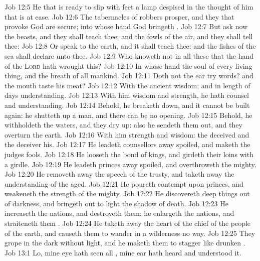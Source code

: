 \vs Job 12:5 He that is ready to slip with  feet  a lamp despised in the thought of him that is at ease.
\vs Job 12:6 The tabernacles of robbers prosper, and they that provoke God are secure; into whose hand God bringeth .
\vs Job 12:7 But ask now the beasts, and they shall teach thee; and the fowls of the air, and they shall tell thee:
\vs Job 12:8 Or speak to the earth, and it shall teach thee: and the fishes of the sea shall declare unto thee.
\vs Job 12:9 Who knoweth not in all these that the hand of the \textsc{Lord} hath wrought this?
\vs Job 12:10 In whose hand  the soul of every living thing, and the breath of all mankind.
\vs Job 12:11 Doth not the ear try words? and the mouth taste his meat?
\vs Job 12:12 With the ancient  wisdom; and in length of days understanding.
\vs Job 12:13 With him  wisdom and strength, he hath counsel and understanding.
\vs Job 12:14 Behold, he breaketh down, and it cannot be built again: he shutteth up a man, and there can be no opening.
\vs Job 12:15 Behold, he withholdeth the waters, and they dry up: also he sendeth them out, and they overturn the earth.
\vs Job 12:16 With him  strength and wisdom: the deceived and the deceiver  his.
\vs Job 12:17 He leadeth counsellors away spoiled, and maketh the judges fools.
\vs Job 12:18 He looseth the bond of kings, and girdeth their loins with a girdle.
\vs Job 12:19 He leadeth princes away spoiled, and overthroweth the mighty.
\vs Job 12:20 He removeth away the speech of the trusty, and taketh away the understanding of the aged.
\vs Job 12:21 He poureth contempt upon princes, and weakeneth the strength of the mighty.
\vs Job 12:22 He discovereth deep things out of darkness, and bringeth out to light the shadow of death.
\vs Job 12:23 He increaseth the nations, and destroyeth them: he enlargeth the nations, and straiteneth them .
\vs Job 12:24 He taketh away the heart of the chief of the people of the earth, and causeth them to wander in a wilderness  no way.
\vs Job 12:25 They grope in the dark without light, and he maketh them to stagger like  drunken .
\vs Job 13:1 Lo, mine eye hath seen all , mine ear hath heard and understood it.
